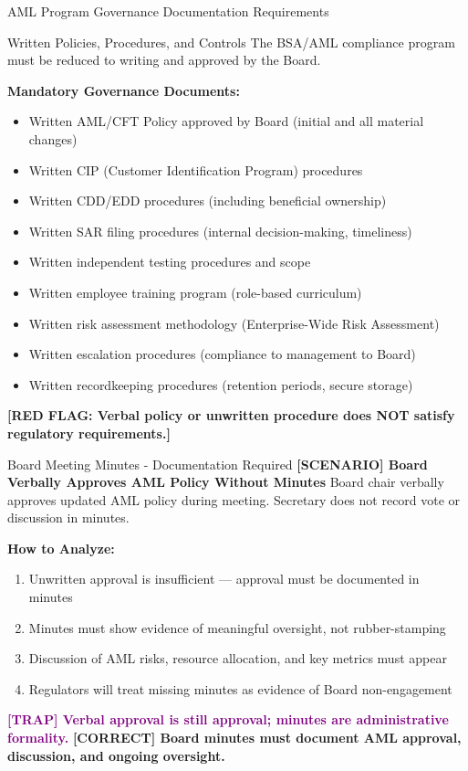 \documentclass[11pt,a4paper]{beamer}
\newcommand{\trap}[1]{\textcolor{purple}{\textbf{[TRAP] #1}}}
\newcommand{\correct}[1]{\textcolor{green!50!black}{\textbf{[CORRECT] #1}}}
\newcommand{\scenario}[1]{\textcolor{blue!70!black}{\textbf{[SCENARIO] #1}}}
\newcommand{\redflag}[1]{\textcolor{red!80!black}{\textbf{[RED FLAG: #1]}}}
\begin{document}
	\begin{frame}{AML Program Governance Documentation Requirements}
		\begin{block}{Written Policies, Procedures, and Controls}
			The BSA/AML compliance program must be reduced to writing and approved by the Board.
		\end{block}
		\textbf{Mandatory Governance Documents:}
		\begin{itemize}
			\item Written AML/CFT Policy approved by Board (initial and all material changes)
			\item Written CIP (Customer Identification Program) procedures
			\item Written CDD/EDD procedures (including beneficial ownership)
			\item Written SAR filing procedures (internal decision-making, timeliness)
			\item Written independent testing procedures and scope
			\item Written employee training program (role-based curriculum)
			\item Written risk assessment methodology (Enterprise-Wide Risk Assessment)
			\item Written escalation procedures (compliance to management to Board)
			\item Written recordkeeping procedures (retention periods, secure storage)
		\end{itemize}
		\redflag{Verbal policy or unwritten procedure does NOT satisfy regulatory requirements.}
	\end{frame}
	
	\begin{frame}{Board Meeting Minutes - Documentation Required}
		\scenario{Board Verbally Approves AML Policy Without Minutes}
		Board chair verbally approves updated AML policy during meeting. Secretary does not record vote or discussion in minutes.
		
		\vspace{0.1cm}
		\textbf{How to Analyze:}
		\begin{enumerate}
			\item Unwritten approval is insufficient — approval must be documented in minutes
			\item Minutes must show evidence of meaningful oversight, not rubber-stamping
			\item Discussion of AML risks, resource allocation, and key metrics must appear
			\item Regulators will treat missing minutes as evidence of Board non-engagement
		\end{enumerate}
		\trap{Verbal approval is still approval; minutes are administrative formality.}
		\correct{Board minutes must document AML approval, discussion, and ongoing oversight.}
	\end{frame}
	
\end{document}

